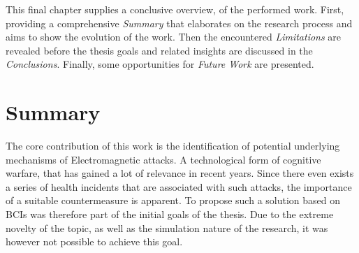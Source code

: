


This final chapter supplies a conclusive overview, of the performed work. First, providing a comprehensive \textit{Summary} that elaborates on the research process and aims to show the evolution of the work. Then the encountered \textit{Limitations} are revealed before the thesis goals and related insights are discussed in the \textit{Conclusions}. Finally, some opportunities for \textit{Future Work} are presented. 
 


\section{Summary}
The core contribution of this work is the identification of potential underlying mechanisms of Electromagnetic attacks. A technological form of cognitive warfare, that has gained a lot of relevance in recent years. Since there even exists a series of health incidents that are associated with such attacks, the importance of a suitable countermeasure is apparent. To propose such a solution based on BCIs was therefore part of the initial goals of the thesis. Due to the extreme novelty of the topic, as well as the simulation nature of the research, it was however not possible to achieve this goal.

